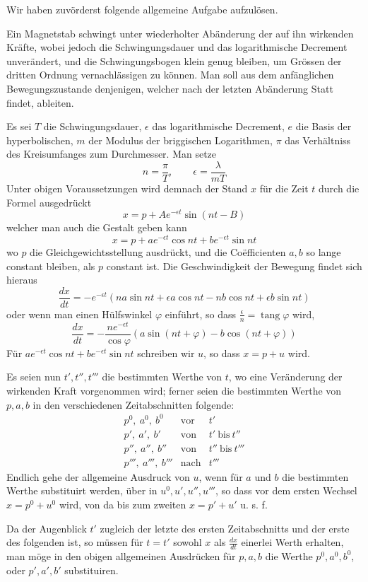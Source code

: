 Wir haben zuvörderst folgende allgemeine Aufgabe aufzulösen.

Ein Magnetstab schwingt unter wiederholter Abänderung der auf ihn wirkenden Kräfte, wobei jedoch die Schwingungsdauer und das logarithmische Decrement unverändert, und die Schwingungsbogen klein genug bleiben, um Grössen der dritten Ordnung vernachlässigen zu können. Man soll aus dem anfänglichen Bewegungszustande denjenigen, welcher nach der letzten Abänderung Statt findet, ableiten.

Es sei $T$ die Schwingungsdauer, $\epsilon$ das logarithmische Decrement, $e$ die Basis der hyperbolischen, $m$ der Modulus der briggischen Logarithmen, $\pi$ das Verhältniss des Kreisumfanges zum Durchmesser. Man setze
\[
n=\frac{\pi}{T},\qquad \epsilon=\frac{\lambda}{mT}
\]
Unter obigen Voraussetzungen wird demnach der Stand $x$ für die Zeit $t$ durch die Formel ausgedrückt
\[
x=p+Ae^{-\epsilon t}\sin(nt-B)
\]
welcher man auch die Gestalt geben kann
\[
x=p+ae^{-\epsilon t}\cos nt+be^{-\epsilon t}\sin nt
\]
wo $p$ die Gleichgewichtsstellung ausdrückt, und die Coëfficienten $a,b$ so lange constant bleiben, als $p$ constant ist. Die Geschwindigkeit der Bewegung findet sich hieraus
\[
\frac{dx}{dt}=-e^{-\epsilon t}(na\sin nt+\epsilon a\cos nt-nb\cos nt+\epsilon b\sin nt)
\]
oder wenn man einen Hülfswinkel $\varphi$ einführt, so dass $\frac{\epsilon}{n}=\operatorname{tang}\varphi$ wird,
\[
\frac{dx}{dt}=-\frac{ne^{-\epsilon t}}{\cos\varphi}(a\sin(nt+\varphi)-b\cos(nt+\varphi))
\]
Für $ae^{-\epsilon t}\cos nt+be^{-\epsilon t}\sin nt$ schreiben wir $u$, so dass $x=p+u$ wird.

Es seien nun $t',t'',t'''$ die bestimmten Werthe von $t$, wo eine Veränderung der wirkenden Kraft vorgenommen wird; ferner seien die bestimmten Werthe von $p,a,b$ in den verschiedenen Zeitabschnitten folgende:
\[
\begin{array}{lll}
p^0,\ a^0,\ b^0&\text{vor}&t'\\
p',\ a',\ b'&\text{von}&t'\ \text{bis}\ t''\\
p'',\ a'',\ b''&\text{von}&t''\ \text{bis}\ t'''\\
p''',\ a''',\ b'''&\text{nach}&t'''
\end{array}
\]
Endlich gehe der allgemeine Ausdruck von $u$, wenn für $a$ und $b$ die bestimmten Werthe substituirt werden, über in $u^0,u',u'',u'''$, so dass vor dem ersten Wechsel $x=p^0+u^0$ wird, von da bis zum zweiten $x=p'+u'$ u. s. f.

Da der Augenblick $t'$ zugleich der letzte des ersten Zeitabschnitts und der erste des folgenden ist, so müssen für $t=t'$ sowohl $x$ als $\frac{dx}{dt}$ einerlei Werth erhalten, man möge in den obigen allgemeinen Ausdrücken für $p,a,b$ die Werthe $p^0,a^0,b^0$, oder $p',a',b'$ substituiren.


